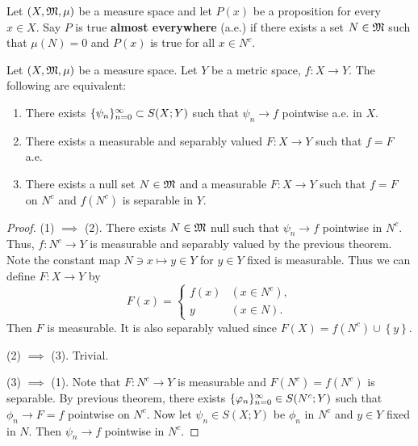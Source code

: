 \documentclass[a4paper]{article}
\begin{document}
\begin{defi}
  
Let $(X, \mathfrak{M}, \mu)$ be a measure space and let 
$P(x)$ be a proposition for every $x \in X$. Say 
$P$ is true \textbf{almost everywhere} (a.e.) if there exists 
a set $N \in \mathfrak{M}$ such that $\mu(N) = 0$ and 
$P(x)$ is true for all $x \in N^c$.

\end{defi}

\begin{thm}
  Let $(X, \mathfrak{M}, \mu)$ be a measure space. Let $Y$ be a 
  metric space, $f: X \to Y$. The following are equivalent:
  \begin{enumerate}
    \item There exists $\{ \psi_n \}_{n=0}^\infty \subset S(X; Y)$
    such that $\psi_n \to f$ pointwise a.e. in $X$.
    \item There exists a measurable and separably valued 
    $F : X \to Y$ such that $f = F$ a.e.
    \item There exists a null set $N \in \mathfrak{M}$ and a 
    measurable $F: X \to Y$ such that $f = F$ 
    on $N^c$ and $f(N^c)$ is separable in
    $Y$.
  \end{enumerate}
\end{thm}

\begin{proof}
  
(1) $\implies$ (2). There exists $N \in \mathfrak{M}$ null such that 
$\psi_n \to f$ pointwise in $N^c$. Thus, 
$f: N^c \to Y$ is measurable and separably valued
by the previous theorem. Note the constant map 
$N \ni x \mapsto y \in Y$ for $y \in Y$ fixed is measurable. 
Thus we can define $F : X \to Y$ by 
\[
F(x) = \begin{cases}
  f(x) & (x \in N^c), \\
  y & (x \in N).
\end{cases}
\]
Then $F$ is measurable. It is also separably valued 
since $F(X) = f(N^c) \cup \left\{ y \right\}$.

(2) $\implies$ (3). Trivial.

(3) $\implies$ (1). Note that $F: N^c \to Y$ is measurable
and $F(N^c) = f(N^c)$ is separable.
By previous theorem, there exists $\{ \varphi_n \}_{n=0}^\infty \in S(N^c; 
Y)$ such that $\phi_n \to F = f$ 
pointwise on $N^c$.
Now let $\psi_n \in S(X; Y)$ be $\phi_n$ in $N^c$ 
and $y \in Y$ fixed in $N$. Then $\psi_n \to f$ pointwise
in $N^c$.

\end{proof}
\end{document}

